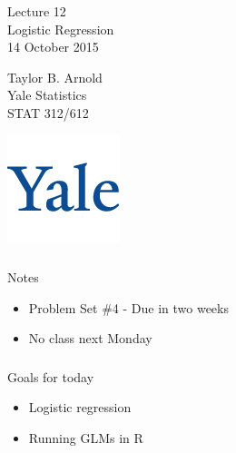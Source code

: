   



\begin{frame}[fragile] \frametitle{}

\vfill

{\fontsize{0.7cm}{0cm}\selectfont Lecture 12 \\\vspace{0.2cm}
Logistic Regression}\\\vspace{0.5cm}
14 October 2015

\vspace{2cm}

\begin{minipage}{0.6\textwidth}
Taylor B. Arnold \\
Yale Statistics \\
STAT 312/612
\end{minipage}
\hfill
\begin{minipage}{0.3\textwidth}\raggedleft
\includegraphics[scale=0.3]{../yale-logo.png}
\end{minipage}%

\end{frame}

\begin{frame}[fragile] \frametitle{}

{\color{yaleblue}\fontsize{16pt}{20pt}\selectfont Notes}

\begin{itemize}
\item Problem Set \#4 - Due in two weeks
\item No class next Monday
\end{itemize}

\end{frame}

\begin{frame}[fragile] \frametitle{}

{\color{yaleblue}\fontsize{16pt}{20pt}\selectfont Goals for today}

\begin{itemize}
\item Logistic regression
\item Running GLMs in R
\end{itemize}

\end{frame}

